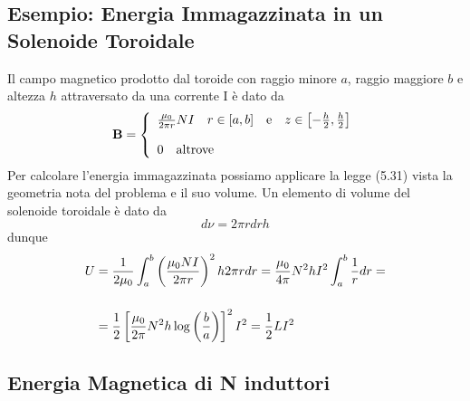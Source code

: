 \subsection{Esempio: Energia Immagazzinata in un Solenoide Toroidale}


Il campo magnetico prodotto dal toroide con raggio minore $a$, raggio maggiore $b$ e altezza $h$ attraversato da una corrente I \`e dato da 
\begin{equation*}
	\bold{B} = \left \{ \begin{array}{l}
		\frac{\mu_0}{2 \pi r}NI \quad r \in [a,b] \quad \text{e} \quad z \in \left[ - \frac{h}{2},\frac{h}{2}\right] \\ \rule{0pt}{20pt}
		0 \quad \text{altrove}
	\end{array}	\right.
\end{equation*}
Per calcolare l'energia immagazzinata possiamo applicare la legge (5.31) vista la geometria nota del problema e il suo volume. Un elemento di volume del solenoide toroidale \`e dato da 
\begin{equation*}
	d \nu = 2 \pi rdr h
\end{equation*}
dunque 
\begin{align*}
	U & = \frac{1}{2 \mu_0}\int_{a}^{b} \left(\frac{\mu_0 NI}{2 \pi r}\right)^2h 2\pi rdr  = \frac{\mu_0}{4 \pi} N^2 hI^2 \int_{a}^{b} \frac{1}{r}dr = \\ \rule{0pt}{30pt} & =\frac{1}{2} \left[\frac{\mu_0}{2 \pi }N^2 h \log\left(\frac{b}{a}\right)\right]^2I^2 =  \frac{1}{2}LI^2
\end{align*}

\subsection{Energia Magnetica di N induttori}

